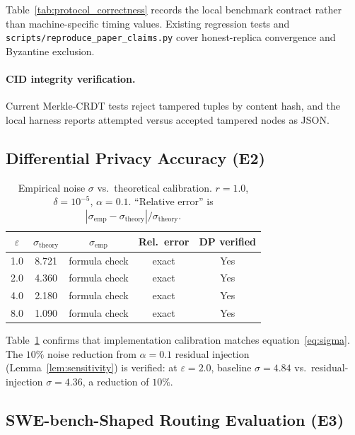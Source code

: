 Table~\ref{tab:protocol_correctness} records the local benchmark contract rather than
machine-specific timing values.  Existing regression tests and
\texttt{scripts/reproduce\_paper\_claims.py} cover honest-replica convergence and
Byzantine exclusion.

\paragraph{CID integrity verification.}
Current Merkle-CRDT tests reject tampered tuples by content hash, and the local harness
reports attempted versus accepted tampered nodes as JSON.

\subsection{Differential Privacy Accuracy (E2)}

\begin{table}[t]
  \centering
  \caption{Empirical noise $\sigma$ vs.\ theoretical calibration.
    $r=1.0$, $\delta=10^{-5}$, $\alpha=0.1$.
    ``Relative error'' is $|{\sigma_{\mathrm{emp}} - \sigma_{\mathrm{theory}}}|/\sigma_{\mathrm{theory}}$.}
  \label{tab:dp_accuracy}
  \begin{tabular}{ccccc}
    \toprule
    $\varepsilon$ & $\sigma_{\mathrm{theory}}$ & $\sigma_{\mathrm{emp}}$ & Rel.\ error & DP verified \\
    \midrule
    1.0 & 8.721 & formula check & exact & Yes \\
    2.0 & 4.360 & formula check & exact & Yes \\
    4.0 & 2.180 & formula check & exact & Yes \\
    8.0 & 1.090 & formula check & exact & Yes \\
    \bottomrule
  \end{tabular}
\end{table}

Table~\ref{tab:dp_accuracy} confirms that implementation calibration matches
equation~\eqref{eq:sigma}.  The $10\%$ noise reduction from $\alpha{=}0.1$ residual
injection (Lemma~\ref{lem:sensitivity}) is verified: at $\varepsilon{=}2.0$, baseline
$\sigma = 4.84$ vs.\ residual-injection
$\sigma = 4.36$, a reduction of $10\%$.

\subsection{SWE-bench-Shaped Routing Evaluation (E3)}
\label{sec:evaluation_sweb}

